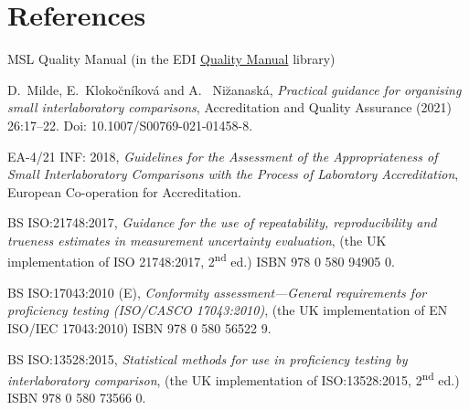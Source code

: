 \section{References}

\begingroup
\renewcommand{\section}[2]{}%

\begin{thebibliography}{99}
 MSL Quality Manual (in the EDI \href{https://edi.callaghaninnovation.govt.nz/ws/msl/QMS/QM?Web=1}{Quality Manual} library)

 D.~Milde, E.~Kloko\u{c}n\'ikov\'a and A.~ Ni\u{z}anask\'a, \textit{Practical guidance for organising small interlaboratory comparisons}, Accreditation and Quality Assurance (2021) 26:17--22. Doi: 10.1007/S00769-021-01458-8.

 EA-4/21 INF: 2018, \textit{Guidelines for the Assessment of the Appropriateness of Small Interlaboratory Comparisons with the Process of Laboratory Accreditation}, European Co-operation for Accreditation.

 BS ISO:21748:2017, \textit{Guidance for the use of repeatability, reproducibility and trueness estimates in measurement uncertainty evaluation}, (the UK implementation of ISO 21748:2017, 2\textsuperscript{nd} ed.)  ISBN 978 0 580 94905 0.

 BS ISO:17043:2010 (E), \textit{Conformity assessment---General requirements for proficiency testing (ISO/CASCO 17043:2010)}, (the UK implementation of EN ISO/IEC 17043:2010) ISBN 978 0 580 56522 9.

 BS ISO:13528:2015, \textit{Statistical methods for use in proficiency testing by interlaboratory comparison}, (the UK implementation of ISO:13528:2015, 2\textsuperscript{nd} ed.) ISBN 978 0 580 73566 0.

\end{thebibliography}
\endgroup

